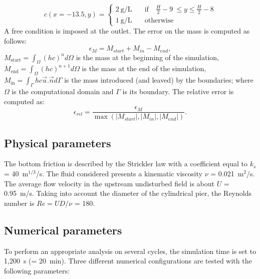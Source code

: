 \begin{equation*}
 c(x=-13.5,y)=\left\{
\begin{array}{rl}
 2~\text{g/L}\quad & \text{if} \quad \frac{H}{2}-9~\leq y \leq \frac{H}{2}-8\\
 1~\text{g/L}\quad & \text{otherwise}
\end{array}\right .
\end{equation*}
A free condition is imposed at the outlet. The error on the mass is computed as follows:
\begin{equation*}
  \epsilon_{M}= M_{start}+M_{in}-M_{end},
\end{equation*}
$M_{\text{start}}=\int_{\Omega}(hc)^nd\Omega$ is the mass at the beginning of
the simulation, $M_{\text{end}}=\int_{\Omega}(hc)^{n+1}d\Omega$ is the mass at
the end of the simulation, $M_{\text{in}}=\int_{\Gamma}hc\vec{u}.\vec{n}d\Gamma$
is the mass introduced (and leaved) by the boundaries;
where $\Omega$ is the computational domain and $\Gamma$ is its boundary.
The relative error is computed as:
\begin{equation*}
  \epsilon_{rel}=\frac{\epsilon_{M}}{\max(|M_{start}|,|M_{in}|,|M_{end}|)}.
\end{equation*}

\subsection{Physical parameters}

The bottom friction is described by the Strickler law with a coefficient equal
to $k_s$ = 40~m$^{1/3}$/s.
The fluid considered presents a kinematic viscosity $\nu$ = 0.021~m$^2$/s.
The average flow velocity in the upstream undisturbed field is
about $U$ = 0.95~m/s.
Taking into account the diameter of the cylindrical pier, the Reynolds number is
$Re = UD/\nu$ = 180.

\subsection{Numerical parameters}
\label{sec:num}
To perform an appropriate analysis on several cycles, the simulation time is set
to 1,200~s (= 20~min).
Three different numerical configurations are tested with the following parameters:
\begin{table}[H]
  \caption{List of the simulation parameters used for the six cases tested in the pildepon example.}
  \label{tab:pildepon:cases}
\end{table}


